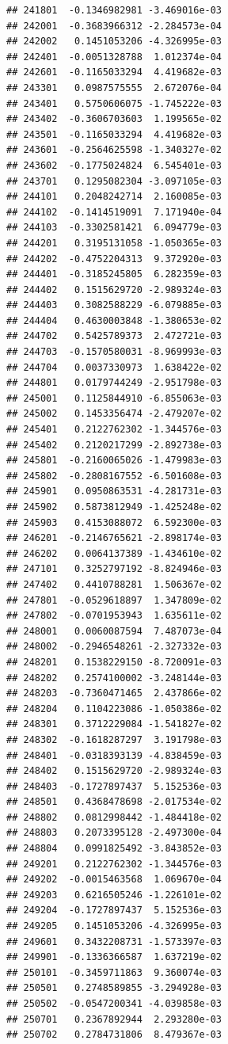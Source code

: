 \begin{frame}[fragile]
\begin{verbatim}
## 241801  -0.1346982981 -3.469016e-03
## 242001  -0.3683966312 -2.284573e-04
## 242002   0.1451053206 -4.326995e-03
## 242401  -0.0051328788  1.012374e-04
## 242601  -0.1165033294  4.419682e-03
## 243301   0.0987575555  2.672076e-04
## 243401   0.5750606075 -1.745222e-03
## 243402  -0.3606703603  1.199565e-02
## 243501  -0.1165033294  4.419682e-03
## 243601  -0.2564625598 -1.340327e-02
## 243602  -0.1775024824  6.545401e-03
## 243701   0.1295082304 -3.097105e-03
## 244101   0.2048242714  2.160085e-03
## 244102  -0.1414519091  7.171940e-04
## 244103  -0.3302581421  6.094779e-03
## 244201   0.3195131058 -1.050365e-03
## 244202  -0.4752204313  9.372920e-03
## 244401  -0.3185245805  6.282359e-03
## 244402   0.1515629720 -2.989324e-03
## 244403   0.3082588229 -6.079885e-03
## 244404   0.4630003848 -1.380653e-02
## 244702   0.5425789373  2.472721e-03
## 244703  -0.1570580031 -8.969993e-03
## 244704   0.0037330973  1.638422e-02
## 244801   0.0179744249 -2.951798e-03
## 245001   0.1125844910 -6.855063e-03
## 245002   0.1453356474 -2.479207e-02
## 245401   0.2122762302 -1.344576e-03
## 245402   0.2120217299 -2.892738e-03
## 245801  -0.2160065026 -1.479983e-03
## 245802  -0.2808167552 -6.501608e-03
## 245901   0.0950863531 -4.281731e-03
## 245902   0.5873812949 -1.425248e-02
## 245903   0.4153088072  6.592300e-03
## 246201  -0.2146765621 -2.898174e-03
## 246202   0.0064137389 -1.434610e-02
## 247101   0.3252797192 -8.824946e-03
## 247402   0.4410788281  1.506367e-02
## 247801  -0.0529618897  1.347809e-02
## 247802  -0.0701953943  1.635611e-02
## 248001   0.0060087594  7.487073e-04
## 248002  -0.2946548261 -2.327332e-03
## 248201   0.1538229150 -8.720091e-03
## 248202   0.2574100002 -3.248144e-03
## 248203  -0.7360471465  2.437866e-02
## 248204   0.1104223086 -1.050386e-02
## 248301   0.3712229084 -1.541827e-02
## 248302  -0.1618287297  3.191798e-03
## 248401  -0.0318393139 -4.838459e-03
## 248402   0.1515629720 -2.989324e-03
## 248403  -0.1727897437  5.152536e-03
## 248501   0.4368478698 -2.017534e-02
## 248802   0.0812998442 -1.484418e-02
## 248803   0.2073395128 -2.497300e-04
## 248804   0.0991825492 -3.843852e-03
## 249201   0.2122762302 -1.344576e-03
## 249202  -0.0015463568  1.069670e-04
## 249203   0.6216505246 -1.226101e-02
## 249204  -0.1727897437  5.152536e-03
## 249205   0.1451053206 -4.326995e-03
## 249601   0.3432208731 -1.573397e-03
## 249901  -0.1336366587  1.637219e-02
## 250101  -0.3459711863  9.360074e-03
## 250501   0.2748589855 -3.294928e-03
## 250502  -0.0547200341 -4.039858e-03
## 250701   0.2367892944  2.293280e-03
## 250702   0.2784731806  8.479367e-03

\end{verbatim}
\end{frame}
